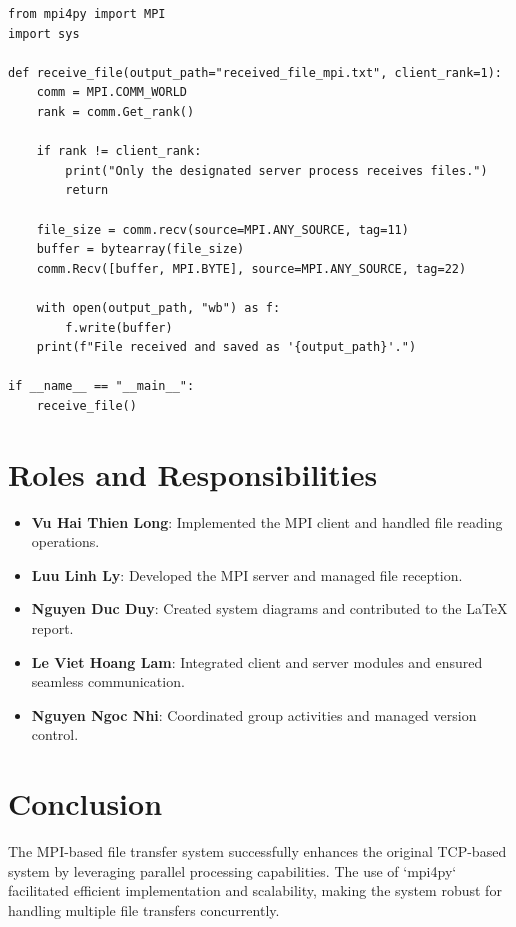 \documentclass{article}
\begin{document}
\begin{lstlisting}[style=mypython, caption=MPI Server Implementation]
from mpi4py import MPI
import sys

def receive_file(output_path="received_file_mpi.txt", client_rank=1):
    comm = MPI.COMM_WORLD
    rank = comm.Get_rank()

    if rank != client_rank:
        print("Only the designated server process receives files.")
        return

    file_size = comm.recv(source=MPI.ANY_SOURCE, tag=11)
    buffer = bytearray(file_size)
    comm.Recv([buffer, MPI.BYTE], source=MPI.ANY_SOURCE, tag=22)

    with open(output_path, "wb") as f:
        f.write(buffer)
    print(f"File received and saved as '{output_path}'.")

if __name__ == "__main__":
    receive_file()
\end{lstlisting}

\section{Roles and Responsibilities}

\begin{itemize}
    \item \textbf{Vu Hai Thien Long}: Implemented the MPI client and handled file reading operations.
    \item \textbf{Luu Linh Ly}: Developed the MPI server and managed file reception.
    \item \textbf{Nguyen Duc Duy}: Created system diagrams and contributed to the LaTeX report.
    \item \textbf{Le Viet Hoang Lam}: Integrated client and server modules and ensured seamless communication.
    \item \textbf{Nguyen Ngoc Nhi}: Coordinated group activities and managed version control.
\end{itemize}

\section{Conclusion}

The MPI-based file transfer system successfully enhances the original TCP-based system by leveraging parallel processing capabilities. The use of `mpi4py` facilitated efficient implementation and scalability, making the system robust for handling multiple file transfers concurrently.
\end{document}
